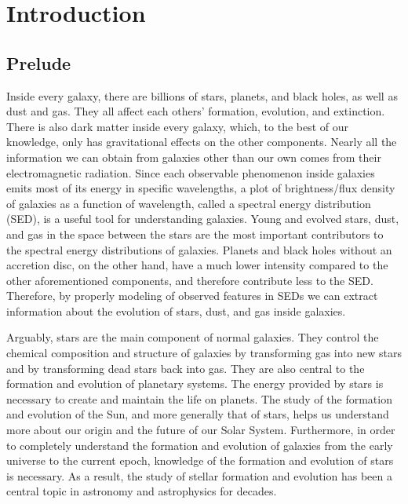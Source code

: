 
\chapter{Introduction}
\label{chap:intro}

\section{Prelude}
\label{sec: overview}
Inside every galaxy, there are billions of stars, planets, and black holes, as well as dust and gas.
They all affect each others' formation, evolution, and extinction.
There is also dark matter inside every galaxy, which, to the best of our knowledge, only has gravitational effects on the other components.
Nearly all the information we can obtain from galaxies other than our own comes from their electromagnetic radiation.
Since each observable phenomenon inside galaxies emits most of its energy in specific wavelengths, 
a plot of brightness/flux density of galaxies as a function of wavelength, called a spectral energy distribution (SED), is a useful tool for understanding galaxies. 
Young and evolved stars, dust, and gas in the space between the stars are the most important contributors to the spectral energy distributions of galaxies.
Planets and black holes without an accretion disc, on the other hand, have a much lower intensity compared to the other aforementioned components, and therefore contribute less to the SED.
Therefore, by properly modeling of observed features in SEDs we can extract information about the evolution of stars, dust, and gas inside galaxies.

Arguably, stars are the main component of normal galaxies.
They control the chemical composition and structure of galaxies by transforming gas into new stars and by transforming dead stars back into gas.
They are also central to the formation and evolution of planetary systems.
The energy provided by stars is necessary to create and maintain the life on planets. 
The study of the formation and evolution of the Sun, and more generally that of stars, helps us understand more about our origin and the future of our Solar System.
Furthermore, in order to completely understand the formation and evolution of galaxies from the early universe to the current epoch, knowledge of the formation and evolution of stars is necessary. 
As a result, the study of stellar formation and evolution has been a central topic in astronomy and astrophysics for decades.

